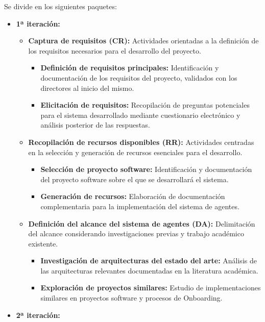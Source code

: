 Se divide en los siguientes paquetes:

\begin{itemize}
  \item\textbf{1ª iteración:}
    \begin{itemize}
      \item\textbf{Captura de requisitos (CR):} Actividades orientadas a la definición de los requisitos necesarios para el desarrollo del proyecto.
            \begin{itemize}
          \item\textbf{Definición de requisitos principales:} Identificación y documentación de los requisitos del proyecto, validados con los directores al inicio del mismo.
          \item\textbf{Elicitación de requisitos:} Recopilación de preguntas potenciales para el sistema desarrollado mediante cuestionario electrónico y análisis posterior de las respuestas.
        \end{itemize}
      \item\textbf{Recopilación de recursos disponibles (RR):} Actividades centradas en la selección y generación de recursos esenciales para el desarrollo.
        \begin{itemize}
          \item\textbf{Selección de proyecto software:} Identificación y documentación del proyecto software sobre el que se desarrollará el sistema.
          \item\textbf{Generación de recursos:} Elaboración de documentación complementaria para la implementación del sistema de agentes.
        \end{itemize}
      \item\textbf{Definición del alcance del sistema de agentes (DA):} Delimitación del alcance considerando investigaciones previas y trabajo académico existente.
    \begin{itemize}
          \item\textbf{Investigación de arquitecturas del estado del arte:} Análisis de las arquitecturas relevantes documentadas en la literatura académica.
          \item\textbf{Exploración de proyectos similares:} Estudio de implementaciones similares en proyectos software y procesos de Onboarding.
    \end{itemize}
      \end{itemize}
  \item\textbf{2ª iteración:}
    \begin{itemize}

\end{itemize}
\end{itemize}
